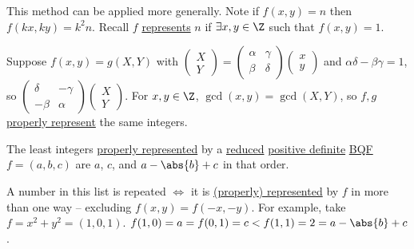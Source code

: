 \documentclass{article}
\begin{document}
This method can be applied more generally.
Note if $f(x, y) = n$ then $f(kx, ky) = k^2n$.
Recall $f$ \hyperlink{def:rep}{represents} $n$ if $\exists x, y \in \Z$ such that $f(x,y) = 1$.


\begin{remark}
    Suppose $f(x, y) = g(X, Y)$ with $\begin{pmatrix}X \\ Y\end{pmatrix} = \begin{pmatrix}\alpha & \gamma \\ \beta & \delta\end{pmatrix} \begin{pmatrix}x \\ y\end{pmatrix}$ and $\alpha\delta - \beta \gamma = 1$, so $\begin{pmatrix}\delta & -\gamma \\ -\beta &  \alpha \end{pmatrix} \begin{pmatrix}X \\ Y\end{pmatrix}$.
    For $x, y \in \Z$, $\gcd(x, y) = \gcd(X, Y)$, so $f, g$ \hyperlink{def:propRep}{properly represent} the same integers.
\end{remark}

\begin{nlemma}\label{lem:4.7}
    The least integers \hyperlink{def:propRep}{properly represented} by a \hyperlink{def:reduced}{reduced} \hyperlink{def:definite}{positive definite} \hyperlink{def:bqf}{BQF} $f = (a, b, c)$ are $a$, $c$, and $a - \abs{b} + c$ in that order.
\end{nlemma}
A number in this list is repeated $\iff$ it is \hyperlink{def:propRep}{(properly) represented} by $f$ in more than one way -- excluding $f(x, y) = f(-x, -y)$.
For example, take $f=x^2 + y^2 = (1, 0, 1)$. $f(1, 0) = a = f(0, 1) = c < f(1, 1) = 2 = a - \abs{b} + c$.
\end{document}
